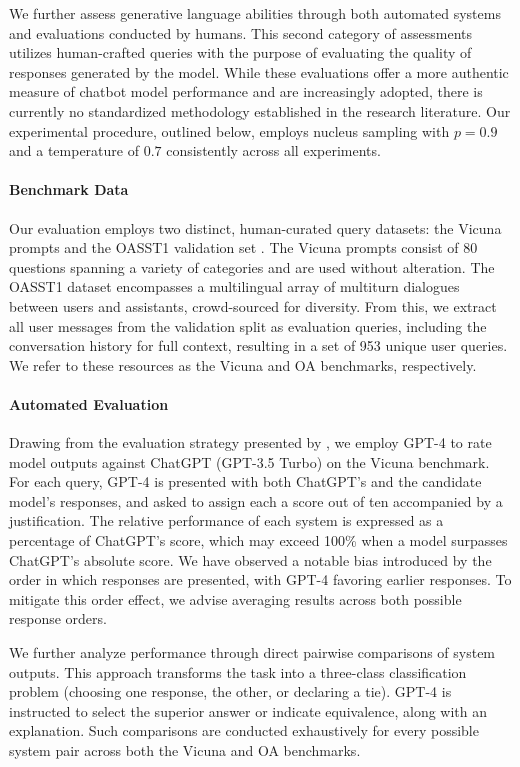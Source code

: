 We further assess generative language abilities through both automated systems and evaluations conducted by humans. This second category of assessments utilizes human-crafted queries with the purpose of evaluating the quality of responses generated by the model. While these evaluations offer a more authentic measure of chatbot model performance and are increasingly adopted, there is currently no standardized methodology established in the research literature. Our experimental procedure, outlined below, employs nucleus sampling with $p=0.9$ and a temperature of $0.7$ consistently across all experiments.

\paragraph{Benchmark Data} Our evaluation employs two distinct, human-curated query datasets: the Vicuna prompts \citep{vicuna2023} and the OASST1 validation set \citep{kopf2023openassistant}. The Vicuna prompts consist of 80 questions spanning a variety of categories and are used without alteration. The OASST1 dataset encompasses a multilingual array of multiturn dialogues between users and assistants, crowd-sourced for diversity. From this, we extract all user messages from the validation split as evaluation queries, including the conversation history for full context, resulting in a set of 953 unique user queries. We refer to these resources as the Vicuna and OA benchmarks, respectively.

\paragraph{Automated Evaluation} Drawing from the evaluation strategy presented by \citet{vicuna2023}, we employ GPT-4 to rate model outputs against ChatGPT (GPT-3.5 Turbo) on the Vicuna benchmark. For each query, GPT-4 is presented with both ChatGPT's and the candidate model’s responses, and asked to assign each a score out of ten accompanied by a justification. The relative performance of each system is expressed as a percentage of ChatGPT's score, which may exceed 100\% when a model surpasses ChatGPT’s absolute score. We have observed a notable bias introduced by the order in which responses are presented, with GPT-4 favoring earlier responses. To mitigate this order effect, we advise averaging results across both possible response orders.

We further analyze performance through direct pairwise comparisons of system outputs. This approach transforms the task into a three-class classification problem (choosing one response, the other, or declaring a tie). GPT-4 is instructed to select the superior answer or indicate equivalence, along with an explanation. Such comparisons are conducted exhaustively for every possible system pair across both the Vicuna and OA benchmarks.

